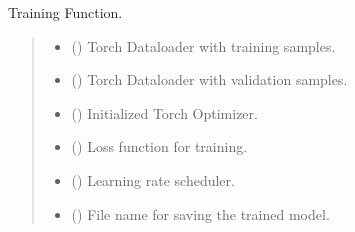 \documentclass[letterpaper,10pt,english]{sphinxmanual}
\begin{document}
\begin{fulllineitems}
\label{\detokenize{index:hypyml.train_utils.train}}
\pysigstartsignatures
{}
\pysigstopsignatures
\sphinxAtStartPar
Training Function.
\begin{quote}\begin{description}
\begin{itemize}
\item {} 
\sphinxAtStartPar
{} () \textendash{} Torch Dataloader with training samples.

\item {} 
\sphinxAtStartPar
{} () \textendash{} Torch Dataloader with validation samples.

\item {} 
\sphinxAtStartPar
{} () \textendash{} Initialized Torch Optimizer.

\item {} 
\sphinxAtStartPar
{} () \textendash{} Loss function for training.

\item {} 
\sphinxAtStartPar
{} () \textendash{} Learning rate scheduler.

\item {} 
\sphinxAtStartPar
{} () \textendash{} File name for saving the trained model.


\end{itemize}
\end{description}
\end{quote}
\end{fulllineitems}
\end{document}
